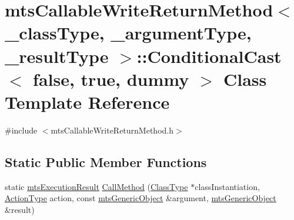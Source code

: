 \hypertarget{classmts_callable_write_return_method_1_1_conditional_cast_3_01false_00_01true_00_01dummy_01_4}{\section{mts\-Callable\-Write\-Return\-Method$<$ \-\_\-class\-Type, \-\_\-argument\-Type, \-\_\-result\-Type $>$\-:\-:Conditional\-Cast$<$ false, true, dummy $>$ Class Template Reference}
\label{classmts_callable_write_return_method_1_1_conditional_cast_3_01false_00_01true_00_01dummy_01_4}
}


{\ttfamily \#include $<$mts\-Callable\-Write\-Return\-Method.\-h$>$}

\subsection*{Static Public Member Functions}
\begin{DoxyCompactItemize}
\item 
static \hyperlink{classmts_execution_result}{mts\-Execution\-Result} \hyperlink{classmts_callable_write_return_method_1_1_conditional_cast_3_01false_00_01true_00_01dummy_01_4_ab6c7ca9fca21849c6aa63073ac0d1743}{Call\-Method} (\hyperlink{classmts_callable_write_return_method_a51dbe6298941ab172d83182c8188092d}{Class\-Type} $\ast$class\-Instantiation, \hyperlink{classmts_callable_write_return_method_a0b5f9726e52abdb0790ccd8c217591b2}{Action\-Type} action, const \hyperlink{classmts_generic_object}{mts\-Generic\-Object} \&argument, \hyperlink{classmts_generic_object}{mts\-Generic\-Object} \&result)
\end{DoxyCompactItemize}


